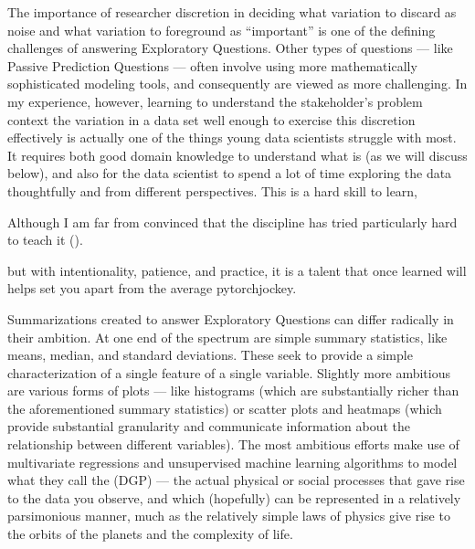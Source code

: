 \documentclass[letterpaper,10pt,english]{jupyterBook}
\begin{document}
\sphinxAtStartPar
The importance of researcher discretion in deciding what variation to discard as noise and what variation to foreground as “important” is one of the defining challenges of answering Exploratory Questions. Other types of questions — like Passive Prediction Questions — often involve using more mathematically sophisticated modeling tools, and consequently are viewed as more challenging. In my experience, however, learning to understand the stakeholder’s problem context  the variation in a data set well enough to exercise this discretion effectively is actually one of the things young data scientists struggle with most. It requires both good domain knowledge to understand what is  (as we will discuss below), and also for the data scientist to spend a lot of time exploring the data thoughtfully and from different perspectives. This is a hard skill to learn,%
\begin{footnote}[1]\sphinxAtStartFootnote
Although I am far from convinced that the discipline has tried particularly hard to teach it ({\hyperref[\detokenize{30_questions/07_eda::doc}]{}}).
%
\end{footnote} but with intentionality, patience, and practice, it is a talent that once learned will helps set you apart from the average pytorch\sphinxhyphen{}jockey.

\sphinxAtStartPar
Summarizations created to answer Exploratory Questions can differ radically in their ambition. At one end of the spectrum are simple summary statistics, like means, median, and standard deviations. These seek to provide a simple characterization of a single feature of a single variable. Slightly more ambitious are various forms of plots — like histograms (which are substantially richer than the aforementioned summary statistics) or scatter plots and heatmaps (which provide substantial granularity and communicate information about the relationship between different variables). The most ambitious efforts make use of multivariate regressions and unsupervised machine learning algorithms to model what they call the  (DGP) — the actual physical or social processes that gave rise to the data you observe, and which (hopefully) can be represented in a relatively parsimonious manner, much as the relatively simple laws of physics give rise to the orbits of the planets and the complexity of life.
\end{document}
